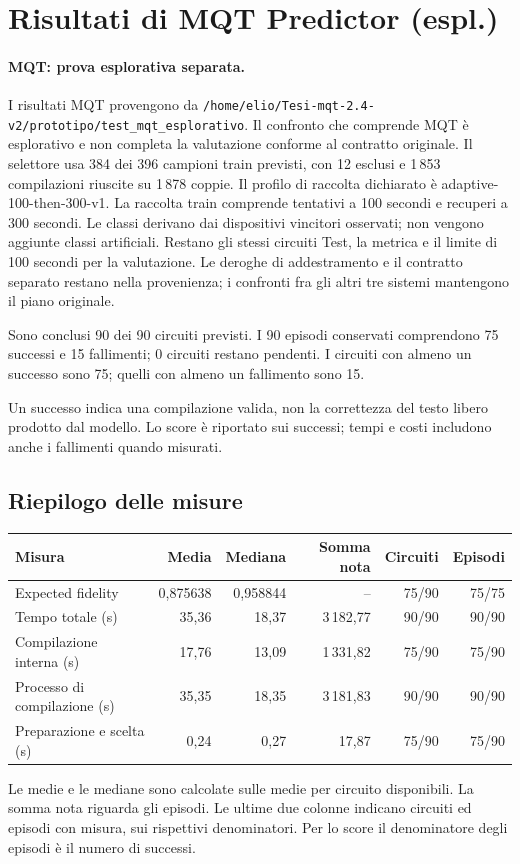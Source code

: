 \providecommand{\TestReportPath}{../}
\section{Risultati di MQT Predictor (espl.)}
\paragraph{MQT: prova esplorativa separata.} I risultati MQT provengono da \nolinkurl{/home/elio/Tesi-mqt-2.4-v2/prototipo/test_mqt_esplorativo}. Il confronto che comprende MQT è esplorativo e non completa la valutazione conforme al contratto originale. Il selettore usa 384 dei 396 campioni train previsti, con 12 esclusi e 1\,853 compilazioni riuscite su 1\,878 coppie. Il profilo di raccolta dichiarato è adaptive-100-then-300-v1. La raccolta train comprende tentativi a 100 secondi e recuperi a 300 secondi. Le classi derivano dai dispositivi vincitori osservati; non vengono aggiunte classi artificiali. Restano gli stessi circuiti Test, la metrica e il limite di 100 secondi per la valutazione. Le deroghe di addestramento e il contratto separato restano nella provenienza; i confronti fra gli altri tre sistemi mantengono il piano originale.

Sono conclusi 90 dei 90 circuiti previsti. I 90 episodi conservati comprendono 75 successi e 15 fallimenti; 0 circuiti restano pendenti. I circuiti con almeno un successo sono 75; quelli con almeno un fallimento sono 15.

Un successo indica una compilazione valida, non la correttezza del testo libero prodotto dal modello. Lo score è riportato sui successi; tempi e costi includono anche i fallimenti quando misurati.

\subsection{Riepilogo delle misure}
\begingroup\footnotesize
\setlength{\tabcolsep}{5pt}
\begin{center}
\begin{tabular}{lrrrrr}
\toprule
Misura & Media & Mediana & Somma nota & Circuiti & Episodi \\
\midrule
Expected fidelity & 0,875638 & 0,958844 & -- & 75/90 & 75/75 \\
Tempo totale (s) & 35,36 & 18,37 & 3\,182,77 & 90/90 & 90/90 \\
Compilazione interna (s) & 17,76 & 13,09 & 1\,331,82 & 75/90 & 75/90 \\
Processo di compilazione (s) & 35,35 & 18,35 & 3\,181,83 & 90/90 & 90/90 \\
Preparazione e scelta (s) & 0,24 & 0,27 & 17,87 & 75/90 & 75/90 \\
\bottomrule
\end{tabular}
\end{center}
\endgroup
Le medie e le mediane sono calcolate sulle medie per circuito disponibili. La somma nota riguarda gli episodi. Le ultime due colonne indicano circuiti ed episodi con misura, sui rispettivi denominatori. Per lo score il denominatore degli episodi è il numero di successi.

